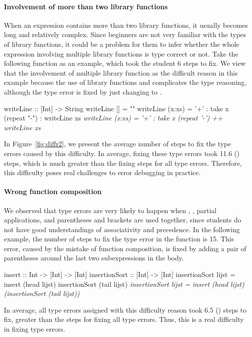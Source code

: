 \documentclass[12pt]{report}	%
\begin{document}
\paragraph{Involvement of more than two library functions}
%
When an expression contains more than two library functions,
it usually becomes long and relatively complex.
Since beginners are not very familiar with the types of library functions,
it could be a problem for them to infer whether the whole expression
involving multiple library functions is type correct or not.
%
%
Take the following function  as an example, which took
the student 6 steps to fix.
We view that the involvement of multiple library function
as the difficult reason in this example because the use of library functions
 and  complicates the type reasoning,
although the type error is fixed by just changing \progdq{-}
to \progsq{-}.
%
\begin{program}
writeLine :: [Int] -> String
writeLine []     = ""
writeLine (x:xs) = '+' : take x (repeat "-") : writeLine xs
\it{writeLine (x:xs) = '+' : take x (repeat '-') ++ writeLine xs}
\end{program}
%
In Figure~\ref{fig:diffr2}, we present the average number
of steps to fix the type errors caused by this difficulty. 
In average, fixing these type errors took 11.6 ()
steps, which is much greater than
the fixing steps for all type errors. 
Therefore, this
difficulty poses real challenges to error debugging in practice.

\paragraph{Wrong function composition}
%
We observed that type errors are very likely to happen
when \prog{\$}, , partial applications,
and parentheses and brackets are used together,
since students do not have good understandings of
associativity and precedence. 
%
In the following example, 
the number of steps to fix the type error in the function  
is 15.
This error, caused by the mistake of function composition,
is fixed by adding a pair of parentheses around the last
two subexpressions in the body.
%
\begin{program}
insert :: Int -> [Int] -> [Int]
insertionSort :: [Int] -> [Int]
insertionSort lijst = insert (head lijst) insertionSort (tail lijst)
\it{insertionSort lijst = insert (head lijst) (insertionSort (tail lijst))}
\end{program}
%
In average, all type errors assigned with this difficulty reason
took 6.5 () steps to fix, greater than the 
steps for fixing all type errors. Thus, this is a
real difficulty in fixing type errors. 
\end{document}
